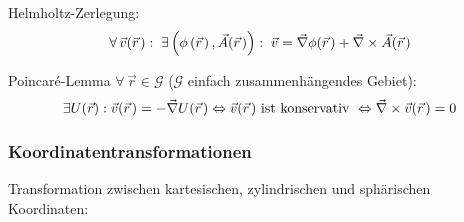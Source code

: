\documentclass[11pt]{article}
\numberwithin{equation}{section}
\begin{document}
				\noindent
				Helmholtz-Zerlegung:
				\begin{equation}
					\forall \,\vec{v}(\pvec{r}):\; \exists\left(\phi\left(\pvec{r}\right),\vec{A}(\pvec{r})\right):\;\vec{v} = \Nabla\phi(\pvec{r}) + 	\Nabla\times\vec{A}(\pvec{r})
				\end{equation}

				\noindent
				Poincaré-Lemma $\forall\, \vec{r}\in\mathcal{G}$ ($\mathcal{G}$ einfach zusammenhängendes Gebiet):
				\begin{equation}
					\exists U(\vec{r}): \vec{v}(\pvec{r}) = -\Nabla U(\pvec{r})
					\Leftrightarrow \vec{v}(\pvec{r}) \text{ ist konservativ }
					\Leftrightarrow \Nabla\times\vec{v}(\pvec{r}) = 0
				\end{equation}

			\subsubsection{Koordinatentransformationen}
				\noindent
				Transformation zwischen kartesischen, zylindrischen und sphärischen Koordinaten:
\end{document}
